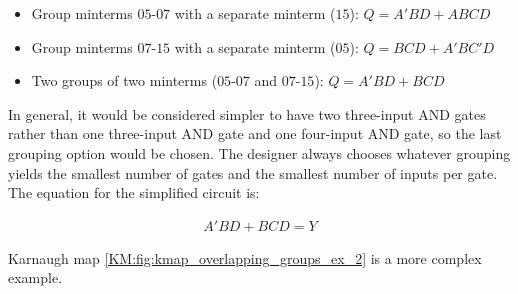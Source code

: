 \begin{itemize}
  \item Group minterms $ 05 $-$ 07 $ with a separate minterm ($ 15 $): $ Q = A'BD + ABCD $ 
  \item Group minterms $ 07 $-$ 15 $ with a separate minterm ($ 05 $): $ Q = BCD + A'BC'D $ 
  \item Two groups of two minterms ($ 05 $-$ 07 $ and $ 07 $-$ 15 $): $ Q = A'BD + BCD $ 
\end{itemize} 

In general, it would be considered simpler to have two three-input \textsf{AND} gates rather than one three-input \textsf{AND} gate and one four-input \textsf{AND} gate, so the last grouping option would be chosen. The designer always chooses whatever grouping yields the smallest number of gates and the smallest number of inputs per gate. The equation for the simplified circuit is: 

\begin{align}
  \label{KM:eq:overlapping_groups_ex_1}
  A'BD+BCD=Y
\end{align}

Karnaugh map \ref{KM:fig:kmap_overlapping_groups_ex_2} is a more complex example.


